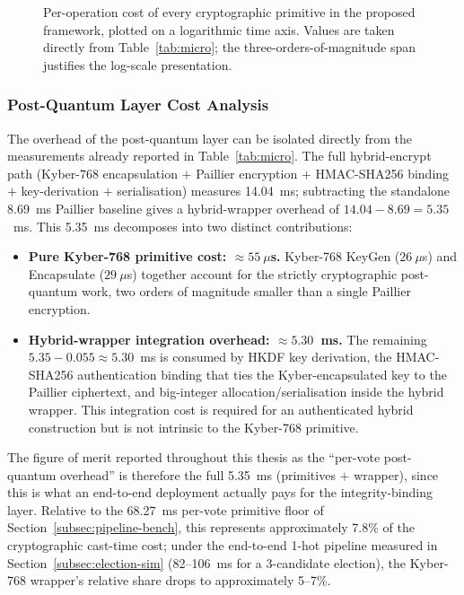 \begin{figure}[H]
\centering

\caption[Cryptographic Primitive Per-Operation Cost]{Per-operation cost of every cryptographic primitive in the proposed framework, plotted on a logarithmic time axis. Values are taken directly from Table~\ref{tab:micro}; the three-orders-of-magnitude span justifies the log-scale presentation.}
\label{fig:crypto-compare}
\end{figure}

\subsubsection{Post-Quantum Layer Cost Analysis}
\label{subsubsec:pq-breakdown}

The overhead of the post-quantum layer can be isolated directly from the measurements already reported in Table~\ref{tab:micro}. The full hybrid-encrypt path (Kyber-768 encapsulation $+$ Paillier encryption $+$ HMAC-SHA256 binding $+$ key-derivation $+$ serialisation) measures 14.04~ms; subtracting the standalone 8.69~ms Paillier baseline gives a hybrid-wrapper overhead of $14.04 - 8.69 = 5.35$~ms. This 5.35~ms decomposes into two distinct contributions:

\begin{itemize}
    \item \textbf{Pure Kyber-768 primitive cost: $\approx 55~\mu$s.} Kyber-768 KeyGen ($26~\mu$s) and Encapsulate ($29~\mu$s) together account for the strictly cryptographic post-quantum work, two orders of magnitude smaller than a single Paillier encryption.
    \item \textbf{Hybrid-wrapper integration overhead: $\approx 5.30$~ms.} The remaining $5.35 - 0.055 \approx 5.30$~ms is consumed by HKDF key derivation, the HMAC-SHA256 authentication binding that ties the Kyber-encapsulated key to the Paillier ciphertext, and big-integer allocation/serialisation inside the hybrid wrapper. This integration cost is required for an authenticated hybrid construction but is not intrinsic to the Kyber-768 primitive.
\end{itemize}

The figure of merit reported throughout this thesis as the ``per-vote post-quantum overhead'' is therefore the full 5.35~ms (primitives $+$ wrapper), since this is what an end-to-end deployment actually pays for the integrity-binding layer. Relative to the 68.27~ms per-vote primitive floor of Section~\ref{subsec:pipeline-bench}, this represents approximately 7.8\% of the cryptographic cast-time cost; under the end-to-end 1-hot pipeline measured in Section~\ref{subsec:election-sim} (82--106~ms for a 3-candidate election), the Kyber-768 wrapper's relative share drops to approximately 5--7\%.

